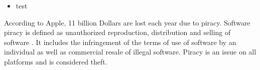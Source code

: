 \begin{itemize}
    \item test
\end{itemize}
According to Apple, 11 billion Dollars are lost each year due to piracy.
Software piracy is defined as unauthorized reproduction, distribution and selling of software \cite{applePiracy}.
It includes the infringement of the terms of use of software by an individual as well as commercial resale of illegal software.
Piracy is an issue on all platforms and is considered theft.
